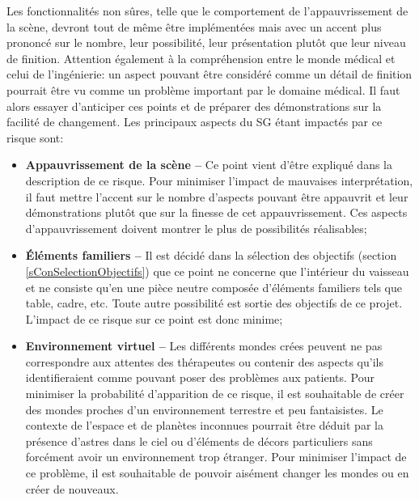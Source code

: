 		Les fonctionnalités non sûres, telle que le comportement de l'appauvrissement de la scène, devront tout de même être implémentées mais avec un accent plus prononcé sur le nombre, leur possibilité, leur présentation plutôt que leur niveau de finition. Attention également à la compréhension entre le monde médical et celui de l'ingénierie: un aspect pouvant être considéré comme un détail de finition pourrait être vu comme un  problème important par le domaine médical. Il faut alors essayer d'anticiper ces points et de préparer des démonstrations sur la facilité de changement.
		Les principaux aspects du SG étant impactés par ce risque sont:
		\begin{itemize}
			\item \textbf{Appauvrissement de la scène --} Ce point vient d'être expliqué dans la description de ce risque. Pour minimiser l'impact de mauvaises interprétation, il faut mettre l'accent sur le nombre d'aspects pouvant être appauvrit et leur démonstrations plutôt que sur la finesse de cet appauvrissement. Ces aspects d'appauvrissement doivent montrer le plus de possibilités réalisables;
			\item \textbf{Éléments familiers --} Il est décidé dans la sélection des objectifs (section \ref{sConSelectionObjectifs}) que ce point ne concerne que l'intérieur du vaisseau et ne consiste qu'en une pièce neutre composée d'éléments familiers tels que table, cadre, etc. Toute autre possibilité est sortie des objectifs de ce projet. L'impact de ce risque sur ce point est donc minime;
			\item \textbf{Environnement virtuel --} Les différents mondes crées peuvent ne pas correspondre aux attentes des thérapeutes ou contenir des aspects qu'ils identifieraient comme pouvant poser des problèmes aux patients. Pour minimiser la probabilité d'apparition de ce risque, il est souhaitable de créer des mondes proches d'un environnement terrestre et peu fantaisistes. Le contexte de l'espace et de planètes inconnues pourrait être déduit par la présence d'astres dans le ciel ou d'éléments de décors particuliers sans forcément avoir un environnement trop étranger. Pour minimiser l'impact de ce problème, il est souhaitable de pouvoir aisément changer les mondes ou en créer de nouveaux.
		\end{itemize}
